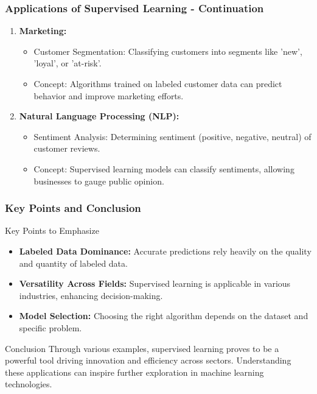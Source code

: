 \documentclass[aspectratio=169]{beamer}
\begin{document}
\begin{frame}[fragile]
    \frametitle{Applications of Supervised Learning - Continuation}
    \begin{enumerate}[resume]
        \item \textbf{Marketing:}
        \begin{itemize}
            \item Customer Segmentation: Classifying customers into segments like 'new', 'loyal', or 'at-risk'.
            \item Concept: Algorithms trained on labeled customer data can predict behavior and improve marketing efforts.
        \end{itemize}

        \item \textbf{Natural Language Processing (NLP):}
        \begin{itemize}
            \item Sentiment Analysis: Determining sentiment (positive, negative, neutral) of customer reviews.
            \item Concept: Supervised learning models can classify sentiments, allowing businesses to gauge public opinion.
        \end{itemize}
    \end{enumerate}
\end{frame}

\begin{frame}[fragile]
    \frametitle{Key Points and Conclusion}
    \begin{block}{Key Points to Emphasize}
        \begin{itemize}
            \item \textbf{Labeled Data Dominance:} Accurate predictions rely heavily on the quality and quantity of labeled data.
            \item \textbf{Versatility Across Fields:} Supervised learning is applicable in various industries, enhancing decision-making.
            \item \textbf{Model Selection:} Choosing the right algorithm depends on the dataset and specific problem.
        \end{itemize}
    \end{block}
    
    \begin{block}{Conclusion}
        Through various examples, supervised learning proves to be a powerful tool driving innovation and efficiency across sectors.
        Understanding these applications can inspire further exploration in machine learning technologies.
    \end{block}
\end{frame}
\end{document}

